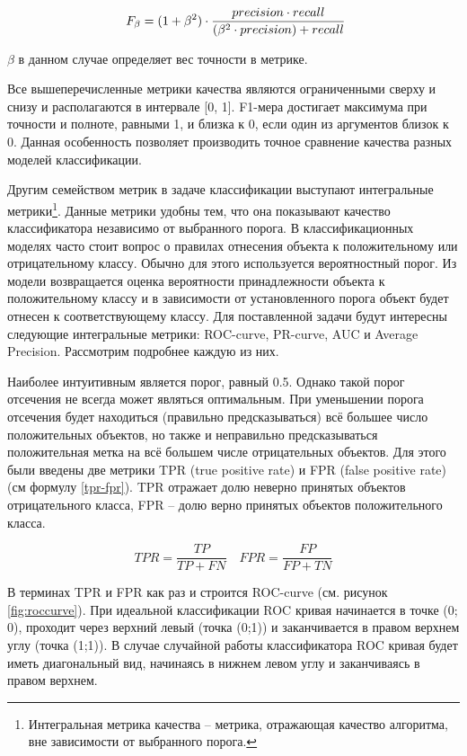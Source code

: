 \documentclass[a4paper,12pt]{extarticle}
\begin{document}
\begin{equation}
	\label{f1}
	\large \ F_\beta = (1 + \beta^2) \cdot \frac{precision \cdot recall}{(\beta^2 \cdot precision) + recall}
\end{equation}

$\beta$ в данном случае определяет вес точности в метрике. 

Все вышеперечисленные метрики качества являются ограниченными сверху и снизу и располагаются в интервале [0, 1]. F1-мера достигает максимума при точности и полноте, равными 1, и близка к 0, если один из аргументов близок к 0. Данная особенность позволяет производить точное сравнение качества разных моделей классификации.

Другим семейством метрик в задаче классификации выступают интегральные метрики\footnote{Интегральная метрика качества – метрика, отражающая качество алгоритма, вне зависимости от выбранного порога.}. Данные метрики удобны тем, что она показывают качество классификатора независимо от выбранного порога. В классификационных моделях часто стоит вопрос о правилах отнесения объекта к положительному или отрицательному классу. Обычно для этого используется вероятностный порог. Из модели возвращается оценка вероятности принадлежности объекта к положительному классу и в зависимости от установленного порога объект будет отнесен к соответствующему классу. Для поставленной задачи будут интересны следующие интегральные метрики: ROC-curve, PR-curve, AUC и Average Precision. Рассмотрим подробнее каждую из них.

Наиболее интуитивным является порог, равный 0.5. Однако такой порог отсечения не всегда может являться оптимальным. При уменьшении порога отсечения будет находиться (правильно предсказываться) всё большее число положительных объектов, но также и неправильно предсказываться положительная метка на всё большем числе отрицательных объектов. Для этого были введены две метрики TPR (true positive rate) и FPR (false positive rate) (см формулу \ref{tpr-fpr}). TPR отражает долю неверно принятых объектов отрицательного класса, FPR – долю верно принятых объектов положительного класса.

\begin{equation}
	\label{tpr-fpr}
	TPR = \frac{TP}{TP + FN} \quad FPR = \frac{FP}{FP + TN} 
\end{equation}

В терминах TPR и FPR как раз и строится ROC-curve (см. рисунок \ref{fig:roccurve}). При идеальной классификации ROC кривая начинается в точке (0; 0), проходит через верхний левый (точка (0;1)) и заканчивается в правом верхнем углу (точка (1;1)). В случае случайной работы классификатора ROC кривая будет иметь диагональный вид, начинаясь в нижнем левом углу и заканчиваясь в правом верхнем.
\end{document}
